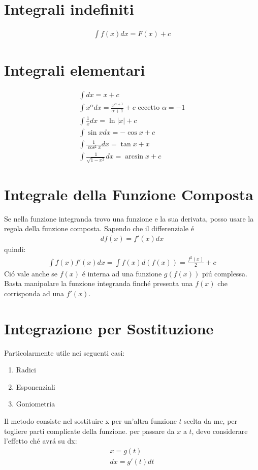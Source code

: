 \documentclass{article}
\title{\jobname}
\author{Eugenio Animali}
\begin{document}
\maketitle

\section{Integrali indefiniti}

\begin{gather*}
    \int f(x)dx = F(x) + c
\end{gather*}
\section{Integrali elementari}
\begin{gather*}
    \int dx = x + c\\
    \int x^\alpha dx = \frac{x^{\alpha + 1}}{\alpha + 1} + c \text{ eccetto } \alpha = - 1\\
    \int \frac{1}{x} dx = \ln |x| + c\\
    \int \sin x dx = - \cos x + c\\
    \int \frac{1}{\cos^2 x}dx = \tan x + x\\
    \int \frac{1}{\sqrt{1 - x^2}} dx = \arcsin x + c
\end{gather*}

\section{Integrale della Funzione Composta}
Se nella funzione integranda trovo una funzione e la sua derivata, posso usare la regola della funzione composta.
Sapendo che il differenziale é
\begin{gather*}
    df(x) = f'(x) dx
\end{gather*}
quindi:
\begin{gather*}
    \int f(x) f'(x) dx = \int f(x) d(f(x)) = \frac{f^2(x)}{2} + c
\end{gather*}
Ció vale anche se $f(x)$ é interna ad una funzione $g(f(x))$ piú complessa. Basta manipolare la funzione integranda finché presenta una $f(x)$ che corrisponda ad una $f'(x)$.
\section{Integrazione per Sostituzione}
Particolarmente utile nei seguenti casi:
\begin{enumerate}
    \item Radici
    \item Esponenziali
    \item Goniometria
\end{enumerate}
Il metodo consiste nel sostituire x per un'altra funzione $t$ scelta da me, per togliere parti complicate della funzione. per passare da $x$ a $t$, devo considerare l'effetto ché avrá su dx:
\begin{gather*}
    x = g(t)\\
    dx = g'(t)dt
\end{gather*}
\end{document}
